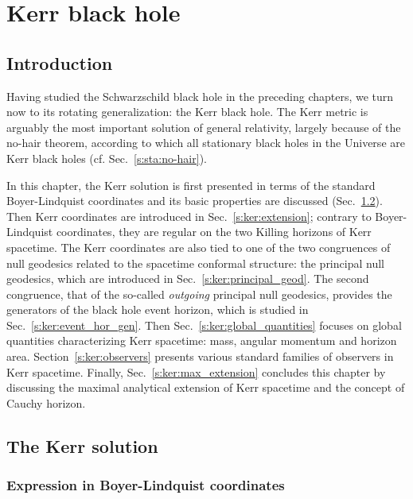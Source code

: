\chapter{Kerr black hole}
\label{s:ker}

\minitoc

\section{Introduction}

Having studied the Schwarzschild black hole in the preceding
chapters, we turn now to its rotating generalization: the Kerr black hole.
The Kerr metric is arguably the most important solution of general relativity,
largely because of the no-hair theorem, according to which
all stationary black holes in the Universe are Kerr black holes (cf. Sec.~\ref{s:sta:no-hair}).

In this chapter, the Kerr solution is first presented in terms of
the standard Boyer-Lindquist coordinates and its basic properties are
discussed (Sec.~\ref{s:ker:Kerr_solution}). Then Kerr coordinates are introduced
in Sec.~\ref{s:ker:extension}; contrary to Boyer-Lindquist coordinates,
they are regular on the two Killing horizons of Kerr spacetime.
The Kerr coordinates are also tied to one of the two congruences of
null geodesics related to the spacetime conformal structure: the
principal null geodesics, which are introduced in Sec.~\ref{s:ker:principal_geod}.
The second congruence, that of the so-called \emph{outgoing} principal null geodesics,
provides the generators of the black hole event horizon, which is
studied in Sec.~\ref{s:ker:event_hor_gen}.
Then Sec.~\ref{s:ker:global_quantities}
focuses on global quantities characterizing Kerr spacetime: mass, angular
momentum and horizon area.
Section~\ref{s:ker:observers} presents various standard families of observers in
Kerr spacetime.
Finally, Sec.~\ref{s:ker:max_extension} concludes
this chapter by discussing the maximal analytical extension of Kerr spacetime
and the concept of Cauchy horizon.


\section{The Kerr solution} \label{s:ker:Kerr_solution}

\subsection{Expression in Boyer-Lindquist coordinates} \label{s:ker:expr_BL}

